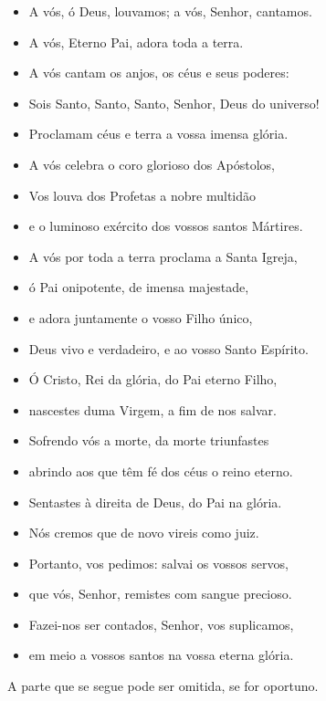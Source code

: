 \begin{itemize}
  \item[] A vós, ó Deus, louvamos; a vós, Senhor, cantamos.
  \item[] A vós, Eterno Pai, adora toda a terra.
  \item[] A vós cantam os anjos, os céus e seus poderes:
  \item[] Sois Santo, Santo, Santo, Senhor, Deus do universo!
  \item[] Proclamam céus e terra a vossa imensa glória.
  \item[] A vós celebra o coro glorioso dos Apóstolos,
  \item[] Vos louva dos Profetas a nobre multidão
  \item[] e o luminoso exército dos vossos santos Mártires.
  \item[] A vós por toda a terra proclama a Santa Igreja,
  \item[] ó Pai onipotente, de imensa majestade,
  \item[] e adora juntamente o vosso Filho único,
  \item[] Deus vivo e verdadeiro, e ao vosso Santo Espírito.
  \item[] Ó Cristo, Rei da glória, do Pai eterno Filho,
  \item[] nascestes duma Virgem, a fim de nos salvar.
  \item[] Sofrendo vós a morte, da morte triunfastes
  \item[] abrindo aos que têm fé dos céus o reino eterno.
  \item[] Sentastes à direita de Deus, do Pai na glória.
  \item[] Nós cremos que de novo vireis como juiz.
  \item[] Portanto, vos pedimos: salvai os vossos servos,
  \item[] que vós, Senhor, remistes com sangue precioso.
  \item[] Fazei-nos ser contados, Senhor, vos suplicamos,
  \item[] em meio a vossos santos na vossa eterna glória.
\end{itemize}

\begin{rubrica}
  A parte que se segue pode ser omitida, se for oportuno.
\end{rubrica}

